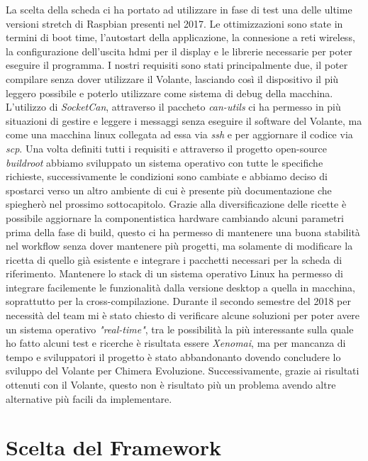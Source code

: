 La scelta della scheda ci ha portato ad utilizzare in fase di test una delle ultime
versioni stretch di Raspbian presenti nel 2017. Le ottimizzazioni sono state in termini
di boot time, l'autostart della applicazione, la connesione a reti wireless,
la configurazione dell'uscita hdmi per il display e le librerie necessarie per poter eseguire il programma. 
I nostri requisiti sono stati principalmente due, il poter compilare senza dover utilizzare il Volante,
lasciando così il dispositivo il più leggero possibile e poterlo utilizzare come sistema di debug della macchina.
L'utilizzo di \emph{SocketCan}, attraverso il paccheto \emph{can-utils} ci ha permesso in più situazioni di gestire e leggere i messaggi
senza eseguire il software del Volante, ma come una macchina linux collegata ad essa via \emph{ssh} e per aggiornare il codice via \emph{scp}.
Una volta definiti tutti i requisiti e attraverso il progetto open-source \emph{buildroot} abbiamo sviluppato
un sistema operativo con tutte le specifiche richieste, successivamente le condizioni sono cambiate e
abbiamo deciso di spostarci verso un altro ambiente di cui è presente più documentazione che spiegherò nel prossimo sottocapitolo. 
Grazie alla diversificazione delle ricette è possibile aggiornare la componentistica hardware cambiando alcuni parametri 
prima della fase di build, questo ci ha permesso di mantenere una buona stabilità nel workflow senza dover mantenere più progetti, ma 
solamente di modificare la ricetta di quello già esistente e integrare i pacchetti necessari per la scheda di riferimento.
Mantenere lo stack di un sistema operativo Linux ha permesso di integrare facilemente le funzionalità dalla versione
desktop a quella in macchina, soprattutto per la cross-compilazione.
Durante il secondo semestre del 2018 per necessità del team mi è stato chiesto di verificare alcune soluzioni per poter avere un sistema operativo
\emph{"real-time"}, tra le possibilità la più interessante sulla quale ho fatto alcuni test e ricerche è risultata essere \emph{Xenomai}, ma per 
mancanza di tempo e sviluppatori il progetto è stato abbandonanto dovendo concludere lo sviluppo del Volante per Chimera Evoluzione.
Successivamente, grazie ai risultati ottenuti con il Volante, questo non è risultato più un problema avendo altre alternative più facili da implementare.

\newpage

\section{Scelta del Framework}

